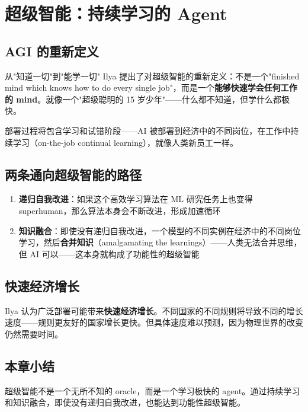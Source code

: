 \section{超级智能：持续学习的 Agent}

\subsection{AGI 的重新定义}

\begin{importantbox}{从"知道一切"到"能学一切"}
Ilya 提出了对超级智能的重新定义：不是一个"finished mind which knows how to do every single job"，而是一个\textbf{能够快速学会任何工作的 mind}。就像一个"超级聪明的 15 岁少年"——什么都不知道，但学什么都极快。
\end{importantbox}

部署过程将包含学习和试错阶段——AI 被部署到经济中的不同岗位，在工作中持续学习（on-the-job continual learning），就像人类新员工一样。

\subsection{两条通向超级智能的路径}

\begin{enumerate}
    \item \textbf{递归自我改进}：如果这个高效学习算法在 ML 研究任务上也变得 superhuman，那么算法本身会不断改进，形成加速循环
    \item \textbf{知识融合}：即使没有递归自我改进，一个模型的不同实例在经济中的不同岗位学习，然后\textbf{合并知识}（amalgamating the learnings）——人类无法合并思维，但 AI 可以——这本身就构成了功能性的超级智能
\end{enumerate}

\subsection{快速经济增长}

Ilya 认为广泛部署可能带来\textbf{快速经济增长}。不同国家的不同规则将导致不同的增长速度——规则更友好的国家增长更快。但具体速度难以预测，因为物理世界的改变仍然需要时间。

\subsection{本章小结}

超级智能不是一个无所不知的 oracle，而是一个学习极快的 agent。通过持续学习和知识融合，即使没有递归自我改进，也能达到功能性超级智能。


